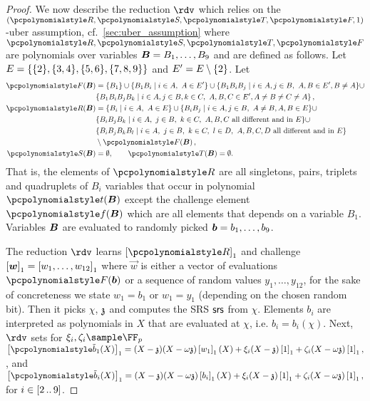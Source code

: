 \begin{proof}
 We now describe the reduction $\rdv$ which
relies on the $(\pR, \pS, \pT, \pF, 1)$-uber assumption, cf.~\cref{sec:uber_assumption}
where $\pR, \pS, \pT, \pF$ are polynomials over variables
$\vB = B_1, \ldots, B_9$ and are defined as follows. Let
$E = \{\{2\}, \{3, 4\}, \{5, 6\}, \{7, 8,
    9\}\}$ and $E' = E \setminus \{2\}$. Let
\begin{align}
\label{eq:uber}
\pF(\vB) & = \smallset{B_1} \cup \smallset{B_1B_i \mid i \in A,\ A \in E'} \cup
             \smallset{B_1B_iB_j \mid i \in A, j \in B,\ A, B \in E', B
             \neq A} \cup \notag\\
           & \smallset{B_1B_iB_jB_k \mid i \in A, j \in
             B, k \in C,\ A, B, C \in E', A \neq B \neq C \neq A}\notag\,,\\
  \pR(\vB) & = \smallset{B_i \mid i \in A,\ A \in E} \cup \smallset{B_i B_j \mid i \in
             A, j \in B,\ A \neq B, A, B \in E} \cup \\ 
           & \smallset{B_i B_j B_k \mid i \in A,\ j \in
             B,\ k \in C,\
             A, B, C \text{ all different and in } E} \cup \notag \\
           & \smallset{B_i B_j B_k B_l \mid i \in A,\ j \in B,\ k \in C,\ l \in D,\
             A, B, C, D \text{ all different and in } E} \notag \\
           & \setminus \pF(\vB)\,,\notag \\
  \pS(\vB) & = \emptyset, \qquad \pT(\vB) = \emptyset.
\end{align}
That is, the elements of $\pR$ are all singletons, pairs, triplets and
quadruplets of $B_i$ variables that occur in polynomial $\pt(\vB)$ except the
challenge element $\pf(\vB)$ which are all elements that depends on a variable
$B_1$. Variables $\vB$ are evaluated to randomly picked
$\vb = b_1, \ldots, b_9$.

The reduction $\rdv$ learns $\gone{\pR}$ and challenge
$\gone{\vec{w}} = \gone{w_1, \ldots, w_{12}}$ where $\vec{w}$ is either a vector
of evaluations $\pF(\vb)$ or a sequence of random values $y_1, \ldots, y_{12}$,
for the sake of concreteness we state $w_1 = b_1$ or $w_1 = y_1$ (depending on
the chosen random bit). Then it picks $\chi$, $\mathfrak{z}$ and computes the SRS $\mathsf{srs}$
from $\chi$. Elements $b_i$ are interpreted as polynomials in $X$ that are
evaluated at $\chi$, i.e. $b_i = b_i(\chi)$. Next, $\rdv$ sets for
$\xi_i, \zeta_i \sample \FF_p$
\(
  \gone{\p{\tb}_1(X)} =
(X - \chz)(X - \ochz) \gone{w_1}(X) + \xi_i (X - \chz) \gone{1} +
\zeta_i (X - \ochz) \gone{1}, %
\),
and
\(
  \gone{\p{\tb}_i(X)} =
(X - \chz)(X - \ochz) \gone{b_i}(X) + \xi_i (X - \chz) \gone{1} +
\zeta_i (X - \ochz) \gone{1}, %
\) 
for $i \in [2 \, .. \, 9]$.


\end{proof}
